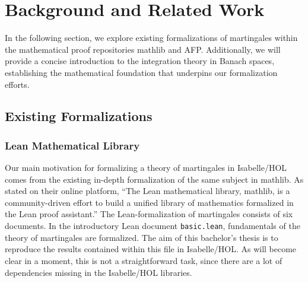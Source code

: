 ﻿%

\chapter{Background and Related Work}\label{chapter:background}

In the following section, we explore existing formalizations of martingales within the mathematical proof repositories \textsf{mathlib} and \textsf{\ac{AFP}}. Additionally, we will provide a concise introduction to the integration theory in Banach spaces, establishing the mathematical foundation that underpins our formalization efforts.

\section{Existing Formalizations}

\subsection{Lean Mathematical Library}

Our main motivation for formalizing a theory of martingales in Isabelle/HOL comes from the existing in-depth formalization of the same subject in \textsf{mathlib}. As stated on their online platform, ``The Lean mathematical library, \textsf{mathlib}, is a community-driven effort to build a unified library of mathematics formalized in the Lean proof assistant.'' The Lean-formalization of martingales consists of six documents. In the introductory Lean document \texttt{basic.lean}, fundamentals of the theory of martingales are formalized. The aim of this bachelor's thesis is to reproduce the results contained within this file in Isabelle/HOL. As will become clear in a moment, this is not a straightforward task, since there are a lot of dependencies missing in the Isabelle/HOL libraries.

